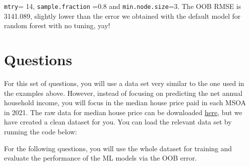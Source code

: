 \documentclass[
  letterpaper,
  DIV=11,
  numbers=noendperiod]{scrreprt}
\newenvironment{Shaded}{\begin{snugshade}}{\end{snugshade}}
\newcommand{\AttributeTok}[1]{\textcolor[rgb]{0.40,0.45,0.13}{#1}}
\newcommand{\CommentTok}[1]{\textcolor[rgb]{0.37,0.37,0.37}{#1}}
\newcommand{\ConstantTok}[1]{\textcolor[rgb]{0.56,0.35,0.01}{#1}}
\newcommand{\FunctionTok}[1]{\textcolor[rgb]{0.28,0.35,0.67}{#1}}
\newcommand{\NormalTok}[1]{\textcolor[rgb]{0.00,0.23,0.31}{#1}}
\newcommand{\OtherTok}[1]{\textcolor[rgb]{0.00,0.23,0.31}{#1}}
\newcommand{\SpecialCharTok}[1]{\textcolor[rgb]{0.37,0.37,0.37}{#1}}
\newcommand{\StringTok}[1]{\textcolor[rgb]{0.13,0.47,0.30}{#1}}
\begin{document}
\texttt{mtry}= 14, \texttt{sample.fraction} =0.8 and
\texttt{min.node.size}=3. The OOB RMSE is 3141.089, slightly lower than
the error we obtained with the default model for random forest with no
tuning, yay!

\hypertarget{questions-7}{%
\section{Questions}\label{questions-7}}

For this set of questions, you will use a data set very similar to the
one used in the examples above. However, instead of focusing on
predicting the net annual household income, you will focus in the median
house price paid in each MSOA in 2021. The raw data for median house
price can be downloaded
\href{https://www.ons.gov.uk/peoplepopulationandcommunity/housing/datasets/hpssadataset2medianhousepricebymsoaquarterlyrollingyear}{here},
but we have created a clean dataset for you. You can load the relevant
data set by running the code below:

\begin{Shaded}
\end{Shaded}

For the following questions, you will use the whole dataset for training
and evaluate the performance of the ML models via the OOB error.
\end{document}
